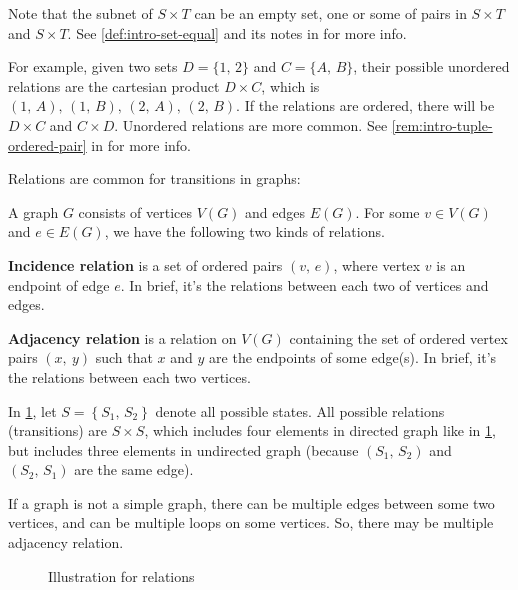 \documentclass[../src/handouts/main.tex]{subfiles}
\begin{document}
Note that the subnet of $S \times T$ can be an empty set, one or some of pairs in $S \times T$ and $S \times T$. See \cref{def:intro-set-equal} and its notes in  for more info.

For example, given two sets $D = \{ 1,\, 2\}$ and $C = \{ A,\, B \}$, their possible unordered relations are the cartesian product $D \times C$, which is $(1,\, A),\, (1,\, B),\, (2,\, A),\, (2,\, B)$. If the relations are ordered, there will be $D \times C$ and $C \times D$. Unordered relations are more common. See \cref{rem:intro-tuple-ordered-pair} in  for more info.

Relations are common for transitions in graphs:
\begin{enumerate*}
  \item A graph $G$ consists of vertices $V(G)$ and edges $E(G)$. For some $v \in V(G)$ and $e \in E(G)$, we have the following two kinds of relations.
  \item \textbf{Incidence relation} is a set of ordered pairs $(v,\, e)$, where vertex $v$ is an endpoint of edge $e$. In brief, it's the relations between each two of vertices and edges.
  \item \textbf{Adjacency relation} is a relation on $V(G)$ containing the set of ordered vertex pairs $(x,\ y)$ such that $x$ and $y$ are the endpoints of some edge(s). In brief, it's the relations between each two vertices.
  \item In \cref{fig:intro-relation}, let $S = \left\{ S_1,\, S_2 \right\}$ denote all possible states. All possible relations (transitions) are $S \times S$, which includes four elements in directed graph like in \cref{fig:intro-relation}, but includes three elements in undirected graph (because $(S_1,\, S_2)$ and $(S_2,\, S_1)$ are the same edge).
  \item If a graph is not a simple graph, there can be multiple edges between some two vertices, and can be multiple loops on some vertices. So, there may be multiple adjacency relation.
\end{enumerate*}

\begin{figure}[ht]
  \centering
  \caption{Illustration for relations}
  \label{fig:intro-relation}
\end{figure}
\end{document}
